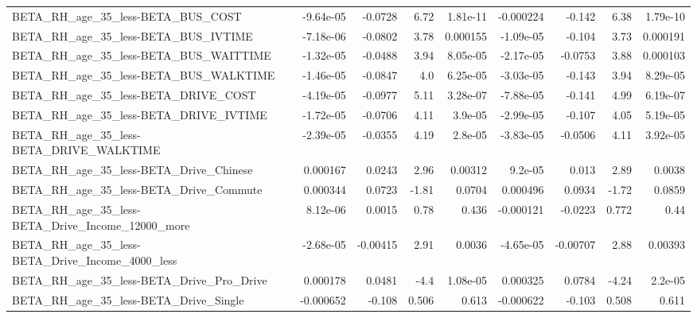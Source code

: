 \begin{tabular}{lrrrrrrrr}
BETA\_RH\_age\_35\_less-BETA\_BUS\_COST                  &   -9.64e-05 &      -0.0728 &      6.72 & 1.81e-11 &  -0.000224 &      -0.142 &         6.38 &      1.79e-10 \\
BETA\_RH\_age\_35\_less-BETA\_BUS\_IVTIME                &   -7.18e-06 &      -0.0802 &      3.78 & 0.000155 &  -1.09e-05 &      -0.104 &         3.73 &      0.000191 \\
BETA\_RH\_age\_35\_less-BETA\_BUS\_WAITTIME              &   -1.32e-05 &      -0.0488 &      3.94 & 8.05e-05 &  -2.17e-05 &     -0.0753 &         3.88 &      0.000103 \\
BETA\_RH\_age\_35\_less-BETA\_BUS\_WALKTIME              &   -1.46e-05 &      -0.0847 &       4.0 & 6.25e-05 &  -3.03e-05 &      -0.143 &         3.94 &      8.29e-05 \\
BETA\_RH\_age\_35\_less-BETA\_DRIVE\_COST                &   -4.19e-05 &      -0.0977 &      5.11 & 3.28e-07 &  -7.88e-05 &      -0.141 &         4.99 &      6.19e-07 \\
BETA\_RH\_age\_35\_less-BETA\_DRIVE\_IVTIME              &   -1.72e-05 &      -0.0706 &      4.11 &  3.9e-05 &  -2.99e-05 &      -0.107 &         4.05 &      5.19e-05 \\
BETA\_RH\_age\_35\_less-BETA\_DRIVE\_WALKTIME            &   -2.39e-05 &      -0.0355 &      4.19 &  2.8e-05 &  -3.83e-05 &     -0.0506 &         4.11 &      3.92e-05 \\
BETA\_RH\_age\_35\_less-BETA\_Drive\_Chinese             &    0.000167 &       0.0243 &      2.96 &  0.00312 &    9.2e-05 &       0.013 &         2.89 &        0.0038 \\
BETA\_RH\_age\_35\_less-BETA\_Drive\_Commute             &    0.000344 &       0.0723 &     -1.81 &   0.0704 &   0.000496 &      0.0934 &        -1.72 &        0.0859 \\
BETA\_RH\_age\_35\_less-BETA\_Drive\_Income\_12000\_more   &    8.12e-06 &       0.0015 &      0.78 &    0.436 &  -0.000121 &     -0.0223 &        0.772 &          0.44 \\
BETA\_RH\_age\_35\_less-BETA\_Drive\_Income\_4000\_less    &   -2.68e-05 &     -0.00415 &      2.91 &   0.0036 &  -4.65e-05 &    -0.00707 &         2.88 &       0.00393 \\
BETA\_RH\_age\_35\_less-BETA\_Drive\_Pro\_Drive           &    0.000178 &       0.0481 &      -4.4 & 1.08e-05 &   0.000325 &      0.0784 &        -4.24 &       2.2e-05 \\
BETA\_RH\_age\_35\_less-BETA\_Drive\_Single              &   -0.000652 &       -0.108 &     0.506 &    0.613 &  -0.000622 &      -0.103 &        0.508 &         0.611 \\

\end{tabular}
